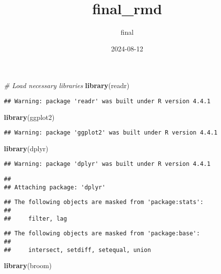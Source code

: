 \documentclass[
]{article}
\title{final\_rmd}
\author{final}
\date{2024-08-12}
\newenvironment{Shaded}{\begin{snugshade}}{\end{snugshade}}
\newcommand{\CommentTok}[1]{\textcolor[rgb]{0.56,0.35,0.01}{\textit{#1}}}
\newcommand{\FunctionTok}[1]{\textcolor[rgb]{0.13,0.29,0.53}{\textbf{#1}}}
\newcommand{\NormalTok}[1]{#1}
\begin{document}
\maketitle

\begin{Shaded}
\begin{Highlighting}[]
\CommentTok{\# Load necessary libraries}
\FunctionTok{library}\NormalTok{(readr)}
\end{Highlighting}
\end{Shaded}

\begin{verbatim}
## Warning: package 'readr' was built under R version 4.4.1
\end{verbatim}

\begin{Shaded}
\begin{Highlighting}[]
\FunctionTok{library}\NormalTok{(ggplot2)}
\end{Highlighting}
\end{Shaded}

\begin{verbatim}
## Warning: package 'ggplot2' was built under R version 4.4.1
\end{verbatim}

\begin{Shaded}
\begin{Highlighting}[]
\FunctionTok{library}\NormalTok{(dplyr)}
\end{Highlighting}
\end{Shaded}

\begin{verbatim}
## Warning: package 'dplyr' was built under R version 4.4.1
\end{verbatim}

\begin{verbatim}
## 
## Attaching package: 'dplyr'
\end{verbatim}

\begin{verbatim}
## The following objects are masked from 'package:stats':
## 
##     filter, lag
\end{verbatim}

\begin{verbatim}
## The following objects are masked from 'package:base':
## 
##     intersect, setdiff, setequal, union
\end{verbatim}

\begin{Shaded}
\begin{Highlighting}[]
\FunctionTok{library}\NormalTok{(broom)}
\end{Highlighting}
\end{Shaded}
\end{document}
